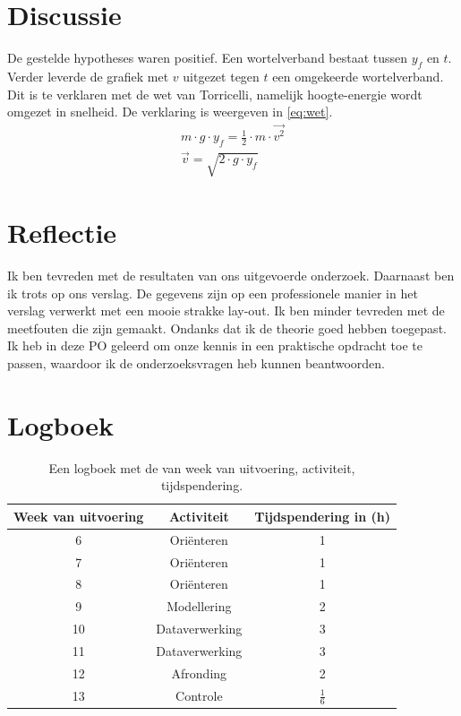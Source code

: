 \documentclass[numbers=endperiod]{scrartcl}
\begin{document}
    
    
    
\newpage
\section{Discussie}
De gestelde hypotheses waren positief. Een wortelverband bestaat tussen $y_f$ en $t$. Verder leverde de grafiek met $v$ uitgezet tegen $t$ een omgekeerde wortelverband. Dit is te verklaren met de wet van Torricelli, namelijk hoogte-energie wordt omgezet in snelheid. De verklaring is weergeven in \cref{eq:wet}.
\begin{equation}\label{eq:wet}
\begin{split}
m \cdot g \cdot y_f = \frac{1}{2} \cdot m \cdot \vec{v^2}\\
\vec{v} = \sqrt{2 \cdot g \cdot y_f}
\end{split}
\end{equation}

\section{Reflectie}
Ik ben tevreden met de resultaten van ons uitgevoerde onderzoek. Daarnaast
ben ik trots op ons verslag. De gegevens zijn op een professionele
manier in het verslag verwerkt met een mooie strakke lay-out. Ik ben minder
tevreden met de meetfouten die zijn gemaakt. Ondanks dat ik de theorie
goed hebben toegepast. Ik heb in deze PO geleerd om onze kennis in
een praktische opdracht toe te passen, waardoor ik de onderzoeksvragen
heb kunnen beantwoorden.


\newpage
\appendix
\section{Logboek}
\begin{table}[ht]
\centering
\caption{Een logboek met de van week van uitvoering, activiteit, tijdspendering.}
\begin{tabular}{Scc}
\toprule
{Week van uitvoering} & Activiteit & Tijdspendering in (\si{\hour})\\
 & Oriënteren & 1\\
7 & Oriënteren & 1\\
8 & Oriënteren & 1\\
9 & Modellering & 2\\
10 & Dataverwerking & 3\\
11 & Dataverwerking & 3\\
12 & Afronding & 2\\
13 & Controle & $\frac{1}{6}$\\
\bottomrule
\end{tabular}
\end{table}
\end{document}
